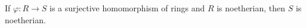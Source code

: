 If $\varphi\colon R\to S$ is a surjective homomorphism of rings and $R$ is noetherian,
then $S$ is noetherian.
